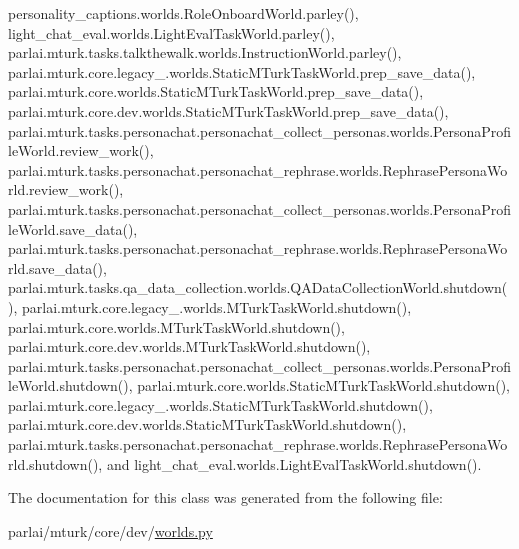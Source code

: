 personality\+\_\+captions.\+worlds.\+Role\+Onboard\+World.\+parley(), light\+\_\+chat\+\_\+eval.\+worlds.\+Light\+Eval\+Task\+World.\+parley(), parlai.\+mturk.\+tasks.\+talkthewalk.\+worlds.\+Instruction\+World.\+parley(), parlai.\+mturk.\+core.\+legacy\+\_.\+worlds.\+Static\+M\+Turk\+Task\+World.\+prep\+\_\+save\+\_\+data(), parlai.\+mturk.\+core.\+worlds.\+Static\+M\+Turk\+Task\+World.\+prep\+\_\+save\+\_\+data(), parlai.\+mturk.\+core.\+dev.\+worlds.\+Static\+M\+Turk\+Task\+World.\+prep\+\_\+save\+\_\+data(), parlai.\+mturk.\+tasks.\+personachat.\+personachat\+\_\+collect\+\_\+personas.\+worlds.\+Persona\+Profile\+World.\+review\+\_\+work(), parlai.\+mturk.\+tasks.\+personachat.\+personachat\+\_\+rephrase.\+worlds.\+Rephrase\+Persona\+World.\+review\+\_\+work(), parlai.\+mturk.\+tasks.\+personachat.\+personachat\+\_\+collect\+\_\+personas.\+worlds.\+Persona\+Profile\+World.\+save\+\_\+data(), parlai.\+mturk.\+tasks.\+personachat.\+personachat\+\_\+rephrase.\+worlds.\+Rephrase\+Persona\+World.\+save\+\_\+data(), parlai.\+mturk.\+tasks.\+qa\+\_\+data\+\_\+collection.\+worlds.\+Q\+A\+Data\+Collection\+World.\+shutdown(), parlai.\+mturk.\+core.\+legacy\+\_.\+worlds.\+M\+Turk\+Task\+World.\+shutdown(), parlai.\+mturk.\+core.\+worlds.\+M\+Turk\+Task\+World.\+shutdown(), parlai.\+mturk.\+core.\+dev.\+worlds.\+M\+Turk\+Task\+World.\+shutdown(), parlai.\+mturk.\+tasks.\+personachat.\+personachat\+\_\+collect\+\_\+personas.\+worlds.\+Persona\+Profile\+World.\+shutdown(), parlai.\+mturk.\+core.\+worlds.\+Static\+M\+Turk\+Task\+World.\+shutdown(), parlai.\+mturk.\+core.\+legacy\+\_.\+worlds.\+Static\+M\+Turk\+Task\+World.\+shutdown(), parlai.\+mturk.\+core.\+dev.\+worlds.\+Static\+M\+Turk\+Task\+World.\+shutdown(), parlai.\+mturk.\+tasks.\+personachat.\+personachat\+\_\+rephrase.\+worlds.\+Rephrase\+Persona\+World.\+shutdown(), and light\+\_\+chat\+\_\+eval.\+worlds.\+Light\+Eval\+Task\+World.\+shutdown().



The documentation for this class was generated from the following file\+:\begin{DoxyCompactItemize}
\item 
parlai/mturk/core/dev/\hyperlink{parlai_2mturk_2core_2dev_2worlds_8py}{worlds.\+py}\end{DoxyCompactItemize}
